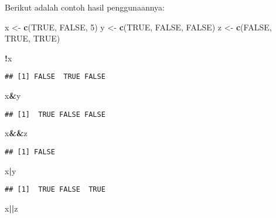 \documentclass[
]{book}
\newenvironment{Shaded}{\begin{snugshade}}{\end{snugshade}}
\newcommand{\DecValTok}[1]{\textcolor[rgb]{0.00,0.00,0.81}{#1}}
\newcommand{\KeywordTok}[1]{\textcolor[rgb]{0.13,0.29,0.53}{\textbf{#1}}}
\newcommand{\NormalTok}[1]{#1}
\newcommand{\OperatorTok}[1]{\textcolor[rgb]{0.81,0.36,0.00}{\textbf{#1}}}
\newcommand{\OtherTok}[1]{\textcolor[rgb]{0.56,0.35,0.01}{#1}}
\newcommand{\StringTok}[1]{\textcolor[rgb]{0.31,0.60,0.02}{#1}}
\begin{document}
Berikut adalah contoh hasil penggunaannya:

\begin{Shaded}
\begin{Highlighting}[]
\NormalTok{x <-}\StringTok{ }\KeywordTok{c}\NormalTok{(}\OtherTok{TRUE}\NormalTok{, }\OtherTok{FALSE}\NormalTok{, }\DecValTok{5}\NormalTok{)}
\NormalTok{y <-}\StringTok{ }\KeywordTok{c}\NormalTok{(}\OtherTok{TRUE}\NormalTok{, }\OtherTok{FALSE}\NormalTok{, }\OtherTok{FALSE}\NormalTok{)}
\NormalTok{z <-}\StringTok{ }\KeywordTok{c}\NormalTok{(}\OtherTok{FALSE}\NormalTok{, }\OtherTok{TRUE}\NormalTok{, }\OtherTok{TRUE}\NormalTok{)}

\OperatorTok{!}\NormalTok{x}
\end{Highlighting}
\end{Shaded}

\begin{verbatim}
## [1] FALSE  TRUE FALSE
\end{verbatim}

\begin{Shaded}
\begin{Highlighting}[]
\NormalTok{x}\OperatorTok{&}\NormalTok{y}
\end{Highlighting}
\end{Shaded}

\begin{verbatim}
## [1]  TRUE FALSE FALSE
\end{verbatim}

\begin{Shaded}
\begin{Highlighting}[]
\NormalTok{x}\OperatorTok{&&}\NormalTok{z}
\end{Highlighting}
\end{Shaded}

\begin{verbatim}
## [1] FALSE
\end{verbatim}

\begin{Shaded}
\begin{Highlighting}[]
\NormalTok{x}\OperatorTok{|}\NormalTok{y}
\end{Highlighting}
\end{Shaded}

\begin{verbatim}
## [1]  TRUE FALSE  TRUE
\end{verbatim}

\begin{Shaded}
\begin{Highlighting}[]
\NormalTok{x}\OperatorTok{||}\NormalTok{z}
\end{Highlighting}
\end{Shaded}
\end{document}
